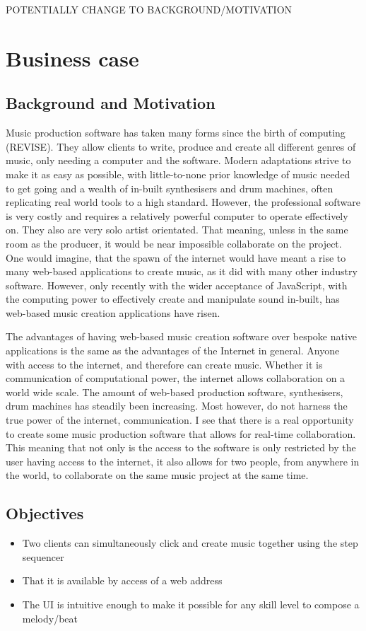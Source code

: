 \documentclass[a4paper]{article}
\begin{document}
POTENTIALLY CHANGE TO BACKGROUND/MOTIVATION
\section{Business case}

\subsection{Background and Motivation}
Music production software has taken many forms since the birth of computing (REVISE). They allow clients to write, produce and create all different genres of music, only needing a computer and the software. Modern adaptations strive to make it as easy as possible, with little-to-none prior knowledge of music needed to get going and a wealth of in-built synthesisers and drum machines, often replicating real world tools to a high standard. However, the professional software is very costly and requires a relatively powerful computer to operate effectively on. They also are very solo artist orientated. That meaning, unless in the same room as the producer, it would be near impossible collaborate on the project. One would imagine, that the spawn of the internet would have meant a rise to many web-based applications to create music, as it did with many other industry software. However, only recently with the wider acceptance of JavaScript, with the computing power to effectively create and manipulate sound in-built, has web-based music creation applications have risen. \par

The advantages of having web-based music creation software over bespoke native applications is the same as the advantages of the Internet in general. Anyone with access to the internet, and therefore can create music. Whether it is communication of computational power, the internet allows collaboration on a world wide scale. The amount of web-based production software, synthesisers, drum machines has steadily been increasing. Most however, do not harness the true power of the internet, communication. I see that there is a real opportunity to create some music production software that allows for real-time collaboration. This meaning that not only is the access to the software is only restricted by the user having access to the internet, it also allows for two people, from anywhere in the world, to collaborate on the same music project at the same time.

\subsection{Objectives}

\begin{itemize}
    \item Two clients can simultaneously click and create music together using the step sequencer
    \item That it is available by access of a web address
    \item The UI is intuitive enough to make it possible for any skill level to compose a melody/beat
\end{itemize}
\end{document}
